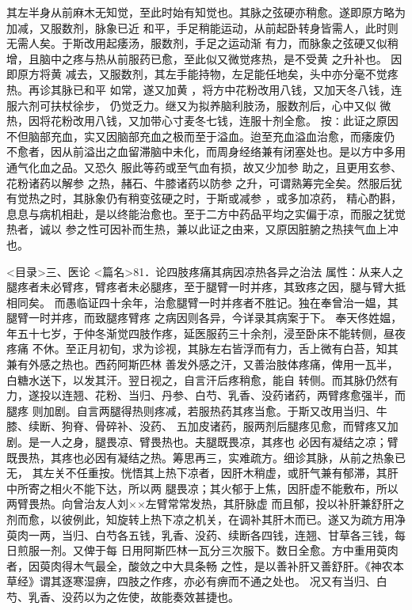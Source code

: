 \documentclass[a4paper,12pt,UTF8,twoside]{ctexbook}
\begin{document}
其左半身从前麻木无知觉，至此时始有知觉也。其脉之弦硬亦稍愈。遂即原方略为加减，又服数剂，脉象已近 
和平，手足稍能运动，从前起卧转身皆需人，此时则无需人矣。于斯改用起痿汤，服数剂，手足之运动渐 
有力，而脉象之弦硬又似稍增，且脑中之疼与热从前服药已愈，至此似又微觉疼热，是不受黄 之升补也。 
因即原方将黄 减去，又服数剂，其左手能持物，左足能任地矣，头中亦分毫不觉疼热。再诊其脉已和平 
如常，遂又加黄 ，将方中花粉改用八钱，又加天冬八钱，连服六剂可扶杖徐步， 
仍觉乏力。继又为拟养脑利肢汤，服数剂后，心中又似 
微热，因将花粉改用八钱，又加带心寸麦冬七钱，连服十剂全愈。 
按∶此证之原因不但脑部充血，实又因脑部充血之极而至于溢血。迨至充血溢血治愈，而痿废仍 
不愈者，因从前溢出之血留滞脑中未化，而周身经络兼有闭塞处也。是以方中多用通气化血之品。又恐久 
服此等药或至气血有损，故又少加参 助之，且更用玄参、花粉诸药以解参 之热，赭石、牛膝诸药以防参 
之升，可谓熟筹完全矣。然服后犹有觉热之时，其脉象仍有稍变弦硬之时，于斯或减参 ，或多加凉药， 
精心酌斟，息息与病机相赴，是以终能治愈也。至于二方中药品平均之实偏于凉，而服之犹觉热者，诚以 
参之性可因补而生热，兼以此证之由来，又原因脏腑之热挟气血上冲也。 

<目录>三、医论
<篇名>81．论四肢疼痛其病因凉热各异之治法
属性：从来人之腿疼者未必臂疼，臂疼者未必腿疼，至于腿臂一时并疼，其致疼之因，腿与臂大抵相同矣。 
而愚临证四十余年，治愈腿臂一时并疼者不胜记。独在奉曾治一媪，其腿臂一时并疼，而致腿疼臂疼 
之病因则各异，今详录其病案于下。 
奉天佟姓媪，年五十七岁，于仲冬渐觉四肢作疼，延医服药三十余剂，浸至卧床不能转侧，昼夜疼痛 
不休。至正月初旬，求为诊视，其脉左右皆浮而有力，舌上微有白苔，知其兼有外感之热也。西药阿斯匹林 
善发外感之汗，又善治肢体疼痛，俾用一瓦半，白糖水送下，以发其汗。翌日视之，自言汗后疼稍愈，能自 
转侧。而其脉仍然有力，遂投以连翘、花粉、当归、丹参、白芍、乳香、没药诸药，两臂疼愈强半，而腿疼 
则加剧。自言两腿得热则疼减，若服热药其疼当愈。于斯又改用当归、牛膝、续断、狗脊、骨碎补、没药、 
五加皮诸药，服两剂后腿疼见愈，而臂疼又加剧。是一人之身，腿畏凉、臂畏热也。夫腿既畏凉，其疼也 
必因有凝结之凉；臂既畏热，其疼也必因有凝结之热。筹思再三，实难疏方。细诊其脉，从前之热象已无， 
其左关不任重按。恍悟其上热下凉者，因肝木稍虚，或肝气兼有郁滞，其肝中所寄之相火不能下达，所以两 
腿畏凉；其火郁于上焦，因肝虚不能敷布，所以两臂畏热。向曾治友人刘××左臂常常发热，其肝脉虚 
而且郁，投以补肝兼舒肝之剂而愈，以彼例此，知旋转上热下凉之机关，在调补其肝木而已。遂又为疏方用净 
萸肉一两，当归、白芍各五钱，乳香、没药、续断各四钱，连翘、甘草各三钱，每日煎服一剂。又俾于每 
日用阿斯匹林一瓦分三次服下。数日全愈。方中重用萸肉者，因萸肉得木气最全，酸敛之中大具条畅 
之性，是以善补肝又善舒肝。《神农本草经》谓其逐寒湿痹，四肢之作疼，亦必有痹而不通之处也。 
况又有当归、白芍、乳香、没药以为之佐使，故能奏效甚捷也。 
\end{document}
